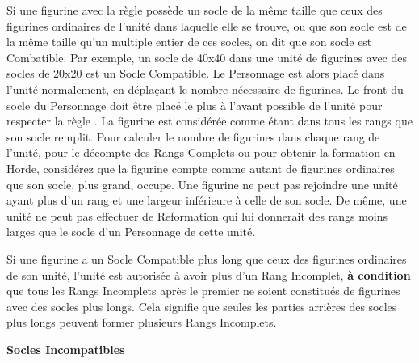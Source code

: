 Si une figurine avec la règle \frontrank{} possède un socle de la même taille que ceux des figurines ordinaires de l'unité dans laquelle elle se trouve, ou que son socle est de la même taille qu'un multiple entier de ces socles, on dit que son socle est Combatible. Par exemple, un socle de \unit{40x40}{\milli\meter} dans une unité de figurines avec des socles de \unit{20x20}{\milli\meter} est un Socle Compatible. Le Personnage est alors placé dans l'unité normalement, en déplaçant le nombre nécessaire de figurines. Le front du socle du Personnage doit être placé le plus à l'avant possible de l'unité pour respecter la règle \frontrank{}. La figurine est considérée comme étant dans tous les rangs que son socle remplit. Pour calculer le nombre de figurines dans chaque rang de l'unité, pour le décompte des Rangs Complets ou pour obtenir la formation en Horde, considérez que la figurine compte comme autant de figurines ordinaires que son socle, plus grand, occupe. Une figurine ne peut pas rejoindre une unité ayant plus d'un rang et une largeur inférieure à celle de son socle. De même, une unité ne peut pas effectuer de Reformation qui lui donnerait des rangs moins larges que le socle d'un Personnage de cette unité.

Si une figurine a un Socle Compatible plus long que ceux des figurines ordinaires de son unité, l'unité est autorisée à avoir plus d'un Rang Incomplet, \textbf{à condition} que tous les Rangs Incomplets après le premier ne soient constitués de figurines avec des socles plus longs. Cela signifie que seules les parties arrières des socles plus longs peuvent former plusieurs Rangs Incomplets.

\noindent\textbf{Socles Incompatibles}

